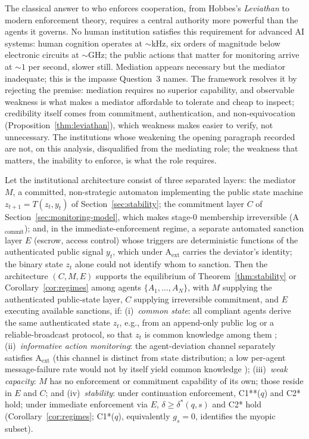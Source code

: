 \documentclass[manuscript,screen,review]{jair}
\begin{document}
The classical answer to who enforces cooperation, from Hobbes's \emph{Leviathan} \cite{hobbes.1651} to modern enforcement theory, requires a central authority more powerful than the agents it governs. No human institution satisfies this requirement for advanced AI systems: human cognition operates at ${\sim}$kHz, six orders of magnitude below electronic circuits at ${\sim}$GHz; the public actions that matter for monitoring arrive at ${\sim}1$ per second, slower still. Mediation appears necessary but the mediator inadequate; this is the impasse Question~3 names. The framework resolves it by rejecting the premise: mediation requires no superior capability, and observable weakness is what makes a mediator affordable to tolerate and cheap to inspect; credibility itself comes from commitment, authentication, and non-equivocation (Proposition~\ref{thm:leviathan}), which weakness makes easier to verify, not unnecessary. The institutions whose weakening the opening paragraph recorded are not, on this analysis, disqualified from the mediating role; the weakness that matters, the inability to enforce, is what the role requires.

\begin{proposition}
\label{thm:leviathan}
Let the institutional architecture consist of three separated layers: the mediator $M$, a committed, non-strategic automaton implementing the public state machine $z_{t+1} = T(z_t, y_t)$ of Section~\ref{sec:stability}; the commitment layer $C$ of Section~\ref{sec:monitoring-model}, which makes stage-0 membership irreversible (A$_{\mathrm{commit}}$); and, in the immediate-enforcement regime, a separate automated sanction layer $E$ (escrow, access control) whose triggers are deterministic functions of the authenticated public signal $y_t$, which under A$_{\mathrm{ext}}$ carries the deviator's identity; the binary state $z_t$ alone could not identify whom to sanction. Then the architecture $(C, M, E)$ supports the equilibrium of Theorem~\ref{thm:stability} or Corollary~\ref{cor:regimes} among agents $\{A_1,\ldots,A_N\}$, with $M$ supplying the authenticated public-state layer, $C$ supplying irreversible commitment, and $E$ executing available sanctions, if:
(i)~\emph{common state}: all compliant agents derive the same authenticated state $z_t$, e.g., from an append-only public log or a reliable-broadcast protocol, so that $z_t$ is common knowledge among them \cite{halpern.moses.1990};
(ii)~\emph{informative action monitoring}: the agent-deviation channel separately satisfies A$_{\mathrm{ext}}$ (this channel is distinct from state distribution; a low per-agent message-failure rate would not by itself yield common knowledge \cite{halpern.moses.1990});
(iii)~\emph{weak capacity}: $M$ has no enforcement or commitment capability of its own; those reside in $E$ and $C$; and
(iv)~\emph{stability}: under continuation enforcement, C1**($q$) and C2* hold; under immediate enforcement via $E$, $\delta \geq \delta^*(q,s)$ and C2* hold (Corollary~\ref{cor:regimes}; C1*($q$), equivalently $g_s = 0$, identifies the myopic subset).
\end{proposition}
\end{document}
